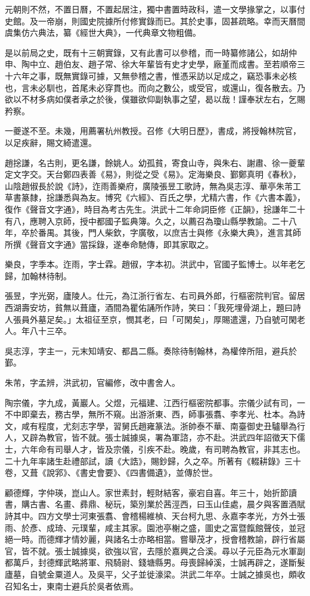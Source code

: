 \begin{pinyinscope}
元朝則不然，不置日曆，不置起居注，獨中書置時政科，遣一文學掾掌之，以事付史館。及一帝崩，則國史院據所付修實錄而已。其於史事，固甚疏略。幸而天曆間虞集仿六典法，纂《經世大典》，一代典章文物粗備。

是以前局之史，既有十三朝實錄，又有此書可以參稽，而一時纂修諸公，如胡仲申、陶中立、趙伯友、趙子常、徐大年輩皆有史才史學，廠堇而成書。至若順帝三十六年之事，既無實錄可據，又無參稽之書，惟憑采訪以足成之，竊恐事未必核也，言未必馴也，首尾未必穿貫也。而向之數公，或受官，或還山，復各散去。乃欲以不材多病如僕者承之於後，僕雖欲仰副執事之望，曷以哉！謹奉狀左右，乞賜矜察。

一夔遂不至。未幾，用薦署杭州教授。召修《大明日歷》，書成，將授翰林院官，以足疾辭，賜文綺遣還。

趙捴謙，名古則，更名謙，餘姚人。幼孤貧，寄食山寺，與朱右、謝肅、徐一夔輩定文字交。天台鄭四表善《易》，則從之受《易》。定海樂良、鄞鄭真明《春秋》，山陰趙俶長於說《詩》，迮雨善樂府，廣陵張昱工歌詩，無為吳志淳、華亭朱芾工草書篆隸，捴謙悉與為友。博究《六經》、百氏之學，尤精六書，作《六書本義》，復作《聲音文字通》，時目為考古先生。洪武十二年命詞臣修《正韻》，捴謙年二十有八，應聘入京師，授中都國子監典簿。久之，以薦召為瓊山縣學教諭。二十八年，卒於番禺。其後，門人柴欽，字廣敬，以庶吉士與修《永樂大典》，進言其師所撰《聲音文字通》當採錄，遂奉命馳傳，即其家取之。

樂良，字季本。迮雨，字士霖。趙俶，字本初。洪武中，官國子監博士。以年老乞歸，加翰林待制。

張昱，字光弼，廬陵人。仕元，為江浙行省左、右司員外郎，行樞密院判官。留居西湖壽安坊，貧無以葺廬，酒間為瞿佑誦所作詩，笑曰：「我死埋骨湖上，題曰詩人張員外墓足矣。」太祖征至京，憫其老，曰「可閑矣」，厚賜遣還，乃自號可閑老人。年八十三卒。

吳志淳，字主一，元末知靖安、都昌二縣。奏除待制翰林，為權倖所阻，避兵於鄞。

朱芾，字孟辨，洪武初，官編修，改中書舍人。

陶宗儀，字九成，黃巖人。父煜，元福建、江西行樞密院都事。宗儀少試有司，一不中即棄去，務古學，無所不窺。出游浙東、西，師事張翥、李孝光、杜本。為詩文，咸有程度，尤刻志字學，習舅氏趙雍篆法。浙帥泰不華、南臺御史丑驢舉為行人，又辟為教官，皆不就。張士誠據吳，署為軍諮，亦不赴。洪武四年詔徵天下儒士，六年命有司舉人才，皆及宗儀，引疾不赴。晚歲，有司聘為教官，非其志也。二十九年率諸生赴禮部試，讀《大誥》，賜鈔歸，久之卒。所著有《輟耕錄》三十卷，又葺《說郛》、《書史會要》、《四書備遺》，並傳於世。

顧德輝，字仲瑛，崑山人。家世素封，輕財結客，豪宕自喜。年三十，始折節讀書，購古書、名畫、彞鼎、秘玩，築別業於茜涇西，曰玉山佳處，晨夕與客置酒賦詩其中。四方文學士河東張翥、會稽楊維楨、天台柯九思、永嘉李孝光，方外士張雨、於彥、成琦、元璞輩，咸主其家。園池亭榭之盛，圖史之富暨餼館聲伎，並冠絕一時。而德輝才情妙麗，與諸名士亦略相當。嘗舉茂才，授會稽教諭，辟行省屬官，皆不就。張士誠據吳，欲強以官，去隱於嘉興之合溪。尋以子元臣為元水軍副都萬戶，封德輝武略將軍、飛騎尉、錢塘縣男。母喪歸綽溪，士誠再辟之，遂斷髮廬墓，自號金粟道人。及吳平，父子並徙濠梁。洪武二年卒。士誠之據吳也，頗收召知名士，東南士避兵於吳者依焉。


\end{pinyinscope}

